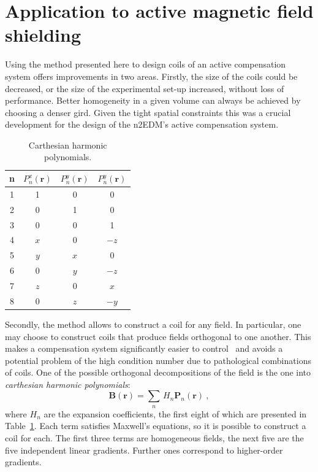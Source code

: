 \section{Application to active magnetic field shielding}
Using the method presented here to design coils of an active compensation system offers improvements in two areas. Firstly, the size of the coils could be decreased, or the size of the experimental set-up increased, without loss of performance. Better homogeneity in a given volume can always be achieved by choosing a denser gird. Given the tight spatial constraints this was a crucial development for the design of the n2EDM's active compensation system.

\begin{table}
  \centering
  \begin{tabular}{c|ccc}
    n & $P_n^x(\mathbf{r})$ & $P_n^y(\mathbf{r})$ & $P_n^y(\mathbf{r})$ \\ \hline
    1 & 1 & 0 & 0 \\
    2 & 0 & 1 & 0 \\
    3 & 0 & 0 & 1 \\ \hline
    4 & $x$ &  0  & $-z$ \\
    5 & $y$ & $x$ &   0  \\
    6 &  0  & $y$ & $-z$ \\
    7 & $z$ &  0  & $ x$ \\
    8 &  0  & $z$ & $-y$ \\
  \end{tabular}
  \caption{Carthesian harmonic polynomials.}
  \label{tab:coils_carthesian_harmonics}
\end{table}

Secondly, the method allows to construct a coil for any field. In particular, one may choose to construct coils that produce fields orthogonal to one another.  This makes a compensation system significantly easier to control~\cite{MRM:MRM1910010107} and avoids a potential problem of the high condition number due to pathological combinations of coils. One of the possible orthogonal decompositions of the field is the one into \emph{carthesian harmonic polynomials}:
\begin{equation}
  \mathbf{B}(\mathbf{r}) = \sum_{n}\,H_n\mathbf{P}_n(\mathbf{r}) \ ,
\end{equation}
where $H_n$ are the expansion coefficients, the first eight of which are presented in Table~\ref{tab:coils_carthesian_harmonics}. Each term satisfies Maxwell's equations, so it is possible to construct a coil for each. The first three terms are homogeneous fields, the next five are the five independent linear gradients. Further ones correspond to higher-order gradients.


